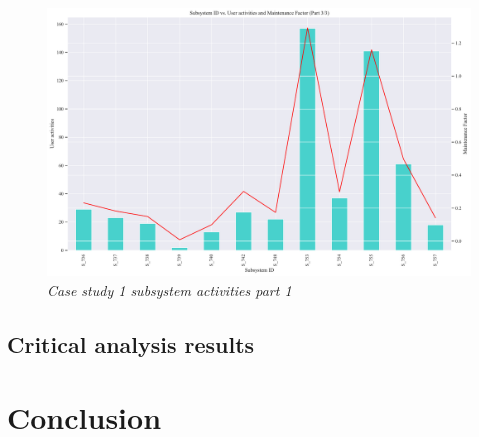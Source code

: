 \begin{landscape}
	\begin{figure}[!htb]
		\centering %
		\includegraphics[width=0.95\linewidth]{img/ch3/analysis/case_B_subsystems_3.pdf}
		\caption[Case study 1 subsystem activities part 1]
		{\textit{Case study 1 subsystem activities part 1}}\label{fig:ch3_saS1S26}
	\end{figure} 
\end{landscape}

\clearpage

\subsection{Critical analysis results}

\section{Conclusion}